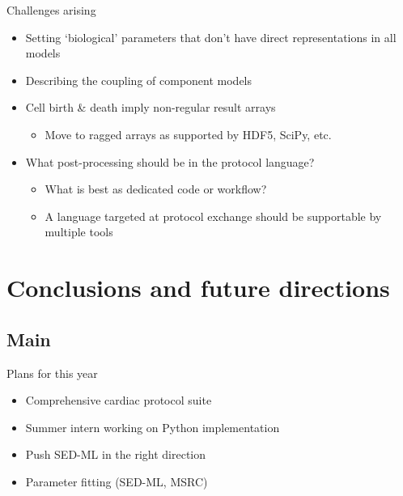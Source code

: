\documentclass[t,xcolor={usenames,dvipsnames}]{beamer}
\newcommand{\subitem}[1]{\begin{itemize}[<.->]\item #1 \end{itemize}}
\begin{document}
\begin{frame}{Challenges arising}
\begin{itemize}
\item Setting `biological' parameters that don't have direct representations in all models
\item Describing the coupling of component models
\item Cell birth \& death imply non-regular result arrays
  \subitem{Move to ragged arrays as supported by HDF5, SciPy, etc.}
\item What post-processing should be in the protocol language?
  \begin{itemize}
  \item What is best as dedicated code or workflow?
  \item A language targeted at protocol exchange should be supportable by multiple tools
  \end{itemize}
\end{itemize}
\end{frame}


\section{Conclusions and future directions}
\subsection*{Main}

\begin{frame}{Plans for this year}
\begin{itemize}
\item Comprehensive cardiac protocol suite
\item Summer intern working on Python implementation
\item Push SED-ML in the right direction
\item Parameter fitting (SED-ML, MSRC)
\end{itemize}
\end{frame}
\end{document}
